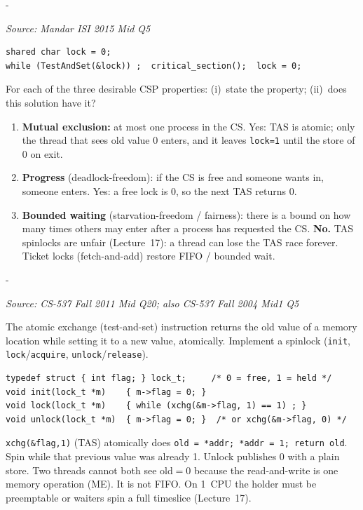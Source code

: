 \documentclass[11pt,a4paper]{article}
\makeatletter
\newcommand{\keepspace}[1]{\par\penalty-100\begingroup
  \setlength{\dimen@}{#1}\dimen@ii\pagegoal\advance\dimen@ii-\pagetotal
  \ifdim\dimen@>\dimen@ii\ifdim\dimen@ii>\z@\vfil\fi\break\fi\endgroup}
\newcounter{qn}[section]
\newenvironment{Qn}[4]{%
  \refstepcounter{qn}\keepspace{7\baselineskip}%
  \begin{tcolorbox}[qboxstyle, title={Q\thesection.\theqn\ \ [#1 \textbar\ #2]\ \ #4}]%
  {\footnotesize\color{g3}\textit{Source: #3}}\par\smallskip%
}{%
  \end{tcolorbox}%
}
\newenvironment{Sol}{%
  \begin{tcolorbox}[sboxstyle, title={Solution}]%
}{%
  \end{tcolorbox}\vspace{0.35em}%
}
\makeatother
\begin{document}
\begin{Qn}{Easy-Medium}{Lect 17}{Mandar ISI 2015 Mid Q5}{TAS spinlock vs.\ the three CSP properties}
\begin{lstlisting}[numbers=none]
shared char lock = 0;
while (TestAndSet(&lock)) ;  critical_section();  lock = 0;
\end{lstlisting}

For each of the three desirable CSP properties: (i)~state the property; (ii)~does this solution have it?
\end{Qn}
\begin{Sol}
\begin{enumerate}
\item \textbf{Mutual exclusion:} at most one process in the CS. Yes: TAS is atomic; only the thread that sees old value 0 enters, and it leaves \texttt{lock=1} until the store of 0 on exit.
\item \textbf{Progress} (deadlock-freedom): if the CS is free and someone wants in, someone enters. Yes: a free lock is 0, so the next TAS returns 0.
\item \textbf{Bounded waiting} (starvation-freedom / fairness): there is a bound on how many times others may enter after a process has requested the CS. \textbf{No.} TAS spinlocks are unfair (Lecture~17): a thread can lose the TAS race forever. Ticket locks (fetch-and-add) restore FIFO / bounded wait.
\end{enumerate}
\end{Sol}

\begin{Qn}{Easy-Medium}{Lect 17}{CS-537 Fall 2011 Mid Q20; also CS-537 Fall 2004 Mid1 Q5}{Implement a spinlock with atomic exchange}
The atomic exchange (test-and-set) instruction returns the old value of a memory location while setting it to a new value, atomically. Implement a spinlock (\texttt{init}, \texttt{lock}/\texttt{acquire}, \texttt{unlock}/\texttt{release}).
\end{Qn}
\begin{Sol}
\begin{lstlisting}[numbers=none]
typedef struct { int flag; } lock_t;     /* 0 = free, 1 = held */
void init(lock_t *m)    { m->flag = 0; }
void lock(lock_t *m)    { while (xchg(&m->flag, 1) == 1) ; }
void unlock(lock_t *m)  { m->flag = 0; }  /* or xchg(&m->flag, 0) */
\end{lstlisting}

\texttt{xchg(\&flag,1)} (TAS) atomically does \texttt{old = *addr; *addr = 1; return old}. Spin while that previous value was already 1. Unlock publishes 0 with a plain store. Two threads cannot both see old$=0$ because the read-and-write is one memory operation (ME). It is not FIFO. On 1~CPU the holder must be preemptable or waiters spin a full timeslice (Lecture~17).
\end{Sol}
\end{document}
